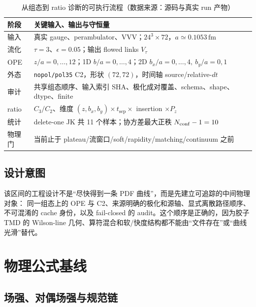 \documentclass[UTF8]{ctexart}
\newcommand{\ts}{t_{\mathrm{sep}}}
\begin{document}
\begin{table}[htbp]
\centering
\small
\caption{从组态到 ratio 诊断的可执行流程（数据来源：源码与真实 run 产物）}
\begin{tabularx}{\textwidth}{@{}l X@{}}
\toprule
阶段 & 关键输入、输出与守恒量 \\
\midrule
输入 & 真实 gauge、perambulator、VVV；\(24^3\times72\)，\(a\simeq0.1053\,\mathrm{fm}\) \\
流化 & \(\tau=3\)、\(\epsilon=0.05\)；输出 flowed links \(V_\tau\) \\
OPE & \(z/a=0,\ldots,12\)；1D \(b/a=0,\ldots,4\)；2D \(b_x/a=0,\ldots,4,\ b_y/a=0,1\) \\
外态 & \texttt{nopol/pol35} C2，形状 \((72,72)\)，时间轴 source/relative-$dt$ \\
审计 & 共享组态顺序、输入索引 SHA、极化成对覆盖、schema、shape、dtype、finite \\
ratio & \(C_3/C_2\)、维度 \((z,b_x,b_y)\times\ts\times\) insertion \(\times P_z\) \\
统计 & delete-one JK 共 11 个样本；协方差最大正秩 \(N_{\rm conf}-1=10\) \\
物理门 & 当前止于 plateau/流窗口/soft/rapidity/matching/continuum 之前 \\
\bottomrule
\end{tabularx}
\end{table}

\subsection{设计意图}

\begin{ideabox}
该区间的工程设计不是“尽快得到一条 PDF 曲线”，而是先建立可追踪的中间物理对象：
同一组态上的 OPE 与 C2、来源明确的极化和源轴、显式离散路径顺序、不可混淆的
cache 身份，以及 fail-closed 的 audit。这个顺序是正确的，因为胶子 TMD 的
Wilson-line 几何、算符混合和软/快度结构都不能由“文件存在”或“曲线光滑”替代。
\end{ideabox}

\section{物理公式基线}

\subsection{场强、对偶场强与规范链}
\end{document}
